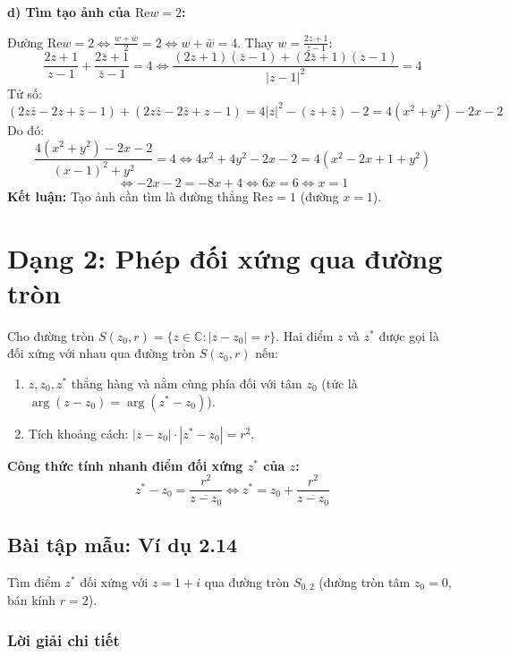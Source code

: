 \documentclass[12pt,a4paper]{article}
\begin{document}
\bigskip
\noindent \textbf{d) Tìm tạo ảnh của $\text{Re}w = 2$:}

Đường $\text{Re}w = 2 \iff \frac{w + \bar{w}}{2} = 2 \iff w + \bar{w} = 4$. Thay $w = \frac{2z + 1}{z - 1}$:
\[ \frac{2z + 1}{z - 1} + \frac{2\bar{z} + 1}{\bar{z} - 1} = 4 \iff \frac{(2z + 1)(\bar{z} - 1) + (2\bar{z} + 1)(z - 1)}{|z - 1|^2} = 4 \]
Tử số:
\[ (2z\bar{z} - 2z + \bar{z} - 1) + (2z\bar{z} - 2\bar{z} + z - 1) = 4|z|^2 - (z + \bar{z}) - 2 = 4(x^2 + y^2) - 2x - 2 \]
Do đó:
\[ \frac{4(x^2 + y^2) - 2x - 2}{(x - 1)^2 + y^2} = 4 \iff 4x^2 + 4y^2 - 2x - 2 = 4(x^2 - 2x + 1 + y^2) \]
\[ \iff -2x - 2 = -8x + 4 \iff 6x = 6 \iff x = 1 \]
\textbf{Kết luận:} Tạo ảnh cần tìm là đường thẳng $\text{Re}z = 1$ (đường $x = 1$).

\newpage
\section{Dạng 2: Phép đối xứng qua đường tròn}

\begin{tcolorbox}[title=Định nghĩa và Công thức điểm đối xứng qua đường tròn]
Cho đường tròn $S(z_0, r) = \{z \in \mathbb{C} : |z - z_0| = r\}$.
Hai điểm $z$ và $z^*$ được gọi là đối xứng với nhau qua đường tròn $S(z_0, r)$ nếu:
\begin{enumerate}
    \item $z, z_0, z^*$ thẳng hàng và nằm cùng phía đối với tâm $z_0$ (tức là $\arg(z - z_0) = \arg(z^* - z_0)$).
    \item Tích khoảng cách: $|z - z_0| \cdot |z^* - z_0| = r^2$.
\end{enumerate}
\textbf{Công thức tính nhanh điểm đối xứng $z^*$ của $z$:}
\[ z^* - z_0 = \frac{r^2}{\overline{z - z_0}} \iff z^* = z_0 + \frac{r^2}{\overline{z - z_0}} \]
\end{tcolorbox}

\subsection*{Bài tập mẫu: Ví dụ 2.14}
Tìm điểm $z^*$ đối xứng với $z = 1 + i$ qua đường tròn $S_{0,2}$ (đường tròn tâm $z_0 = 0$, bán kính $r = 2$).

\subsubsection*{Lời giải chi tiết}
\end{document}
